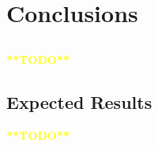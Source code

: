 \chapter{Conclusions} \label{chap:concl}

\section*{}

\textcolor{yellow}{\textbf{**TODO**}}

\section{Expected Results}

\textcolor{yellow}{\textbf{**TODO**}}




